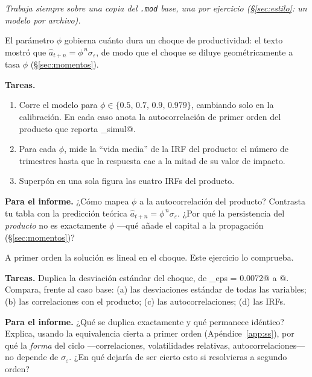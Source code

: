 \documentclass[11pt,a4paper]{report}
\newcounter{ejer}
\newenvironment{ejercicio}[1]{%
  \refstepcounter{ejer}%
  \begin{tcolorbox}[ejerstyle, title={Ejercicio~\theejer~~\textbullet~~#1}]}%
{\end{tcolorbox}}
\newcommand{\code}[1]{\texttt{#1}}
\begin{document}
\begin{center}
\small\itshape Trabaja siempre sobre una \emph{copia} del \code{.mod} base, una por
ejercicio (\S\ref{sec:estilo}: un modelo por archivo).
\end{center}

\begin{ejercicio}{Persistencia del choque: un barrido en $\phi$}
El parámetro $\phi$ gobierna cuánto dura un choque de productividad: el texto mostró
que $\hat a_{t+n}=\phi^{\,n}\sigma_\varepsilon$, de modo que el choque se diluye
geométricamente a tasa $\phi$ (\S\ref{sec:momentos}).

\medskip\noindent\textbf{Tareas.}
\begin{enumerate}[leftmargin=1.5em, topsep=2pt, itemsep=2pt, label=(\alph*)]
\item Corre el modelo para $\phi\in\{0.5,\,0.7,\,0.9,\,0.979\}$, cambiando solo
  \lstinline@phi@ en la calibración. En cada caso anota la autocorrelación de primer
  orden del producto que reporta \lstinline@stoch_simul@.
\item Para cada $\phi$, mide la ``vida media'' de la IRF del producto: el número de
  trimestres hasta que la respuesta cae a la mitad de su valor de impacto.
\item Superpón en una sola figura las cuatro IRFs del producto.
\end{enumerate}

\medskip\noindent\textbf{Para el informe.} ¿Cómo mapea $\phi$ a la autocorrelación
del producto? Contrasta tu tabla con la predicción teórica $\hat a_{t+n}=\phi^{\,n}
\sigma_\varepsilon$. ¿Por qué la persistencia del \emph{producto} no es exactamente
$\phi$ ---qué añade el capital a la propagación (\S\ref{sec:momentos})?
\end{ejercicio}

\begin{ejercicio}{Tamaño del choque y equivalencia cierta}
A primer orden la solución es lineal en el choque. Este ejercicio lo comprueba.

\medskip\noindent\textbf{Tareas.} Duplica la desviación estándar del choque, de
\lstinline@sigma_eps = 0.0072@ a @. Compara, frente al caso base:
(a) las desviaciones estándar de todas las variables; (b) las correlaciones con el
producto; (c) las autocorrelaciones; (d) las IRFs.

\medskip\noindent\textbf{Para el informe.} ¿Qué se duplica exactamente y qué
permanece idéntico? Explica, usando la equivalencia cierta a primer orden
(Apéndice~\ref{app:ss}), por qué la \emph{forma} del ciclo ---correlaciones,
volatilidades relativas, autocorrelaciones--- no depende de $\sigma_\varepsilon$.
¿En qué dejaría de ser cierto esto si resolvieras a segundo orden?
\end{ejercicio}
\end{document}
